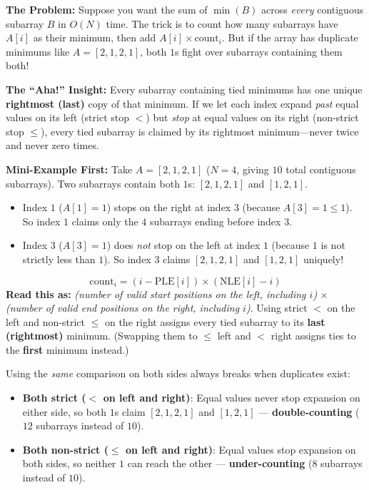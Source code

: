 \documentclass[11pt,a4paper]{article}
\theoremstyle{definition}
\newcommand{\painbeat}{\textbf{\color{accentamber}The Problem:} }
\newcommand{\ahabeat}{\textbf{\color{accentteal}The ``Aha!'' Insight:} }
\newcommand{\examplebeat}{\textbf{\color{primaryblue}Mini-Example First:} }
\begin{document}
\painbeat Suppose you want the sum of $\min(B)$ across \emph{every} contiguous subarray $B$ in $O(N)$ time. The trick is to count how many subarrays have $A[i]$ as their minimum, then add $A[i] \times \text{count}_i$. But if the array has duplicate minimums like $A = [2, 1, 2, 1]$, both $1$s fight over subarrays containing them both!

\ahabeat Every subarray containing tied minimums has one unique \textbf{rightmost (last)} copy of that minimum. If we let each index expand \emph{past} equal values on its left (strict stop $<$) but \emph{stop} at equal values on its right (non-strict stop $\le$), every tied subarray is claimed by its rightmost minimum---never twice and never zero times.

\examplebeat Take $A = [2, 1, 2, 1]$ ($N = 4$, giving $10$ total contiguous subarrays). Two subarrays contain both $1$s: $[2, 1, 2, 1]$ and $[1, 2, 1]$.
\begin{itemize}
    \item Index $1$ ($A[1] = 1$) stops on the right at index $3$ (because $A[3] = 1 \le 1$). So index $1$ claims only the $4$ subarrays ending before index $3$.
    \item Index $3$ ($A[3] = 1$) does \emph{not} stop on the left at index $1$ (because $1$ is not strictly less than $1$). So index $3$ claims $[2, 1, 2, 1]$ and $[1, 2, 1]$ uniquely!
\end{itemize}

\begin{formulabox}
$$
\text{count}_i = (i - \text{PLE}[i]) \times (\text{NLE}[i] - i)
$$
\textbf{Read this as:} \emph{(number of valid start positions on the left, including $i$)} $\times$ \emph{(number of valid end positions on the right, including $i$)}. Using strict $<$ on the left and non-strict $\le$ on the right assigns every tied subarray to its \textbf{last (rightmost)} minimum. (Swapping them to $\le$ left and $<$ right assigns ties to the \textbf{first} minimum instead.)
\end{formulabox}

\begin{watchoutbox}
Using the \emph{same} comparison on both sides always breaks when duplicates exist:
\begin{itemize}
    \item \textbf{Both strict ($<$ on left and right)}: Equal values never stop expansion on either side, so both $1$s claim $[2, 1, 2, 1]$ and $[1, 2, 1]$ --- \textbf{double-counting} ($12$ subarrays instead of $10$).
    \item \textbf{Both non-strict ($\le$ on left and right)}: Equal values stop expansion on both sides, so neither $1$ can reach the other --- \textbf{under-counting} ($8$ subarrays instead of $10$).
\end{itemize}
\end{watchoutbox}
\end{document}
